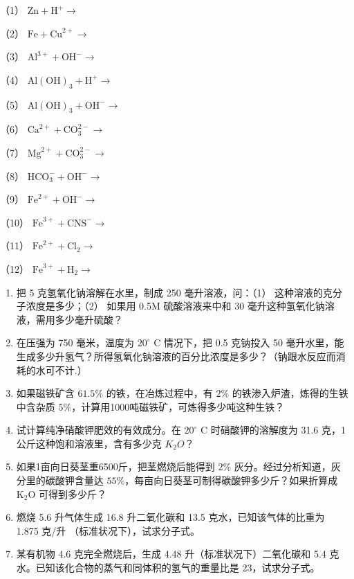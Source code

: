 （1） \(\mathrm{Zn} + \mathrm{H}^{+} \longrightarrow\)

（2） \(\mathrm{Fe} + \mathrm{Cu}^{2+} \longrightarrow\)

（3） \(\mathrm{Al}^{3+} + \mathrm{OH}^{-} \longrightarrow\)

（4） \(\mathrm{Al(OH)}_3 + \mathrm{H}^+ \longrightarrow\)

（5） \(\mathrm{Al(OH)}_3 + \mathrm{OH}^- \longrightarrow\)

（6） \(\mathrm{Ca}^{2+} + \mathrm{CO}_3^{2-}\longrightarrow\)

（7） \(\mathrm{Mg}^{2+} + \mathrm{CO}_{3}^{2-}\longrightarrow\)

（8） \(\mathrm{HCO}_{3}^{-} + \mathrm{OH}^{-}\longrightarrow\)

（9） \(\mathrm{Fe}^{2+} + \mathrm{OH}^{-}\longrightarrow\)

（10） \(\mathrm{Fe}^{3+} + \mathrm{CNS}^{-}\longrightarrow\)

（11） \(\mathrm{Fe}^{2+} + \mathrm{Cl}_2\longrightarrow\)

（12） \(\mathrm{Fe}^{3+} + \mathrm{H}_2\longrightarrow\)

\begin{enumerate}[start=20]
\item
  把 5 克氢氧化钠溶解在水里，制成 250 毫升溶液，问：（1）
  这种溶液的克分子浓度是多少；（2） 如果用 0.5M 硫酸溶液来中和 30
  毫升这种氢氧化钠溶液，需用多少毫升硫酸？
\item
  在压强为 750 毫米，温度为 \(20^{\circ}\) C 情况下，把 0.5 克钠投入 50
  毫升水里，能生成多少升氢气？所得氢氧化钠溶液的百分比浓度是多少？（钠跟水反应而消耗的水可不计.）
\item
  如果磁铁矿含 \(61.5\%\) 的铁，在冶炼过程中，有 \(2\%\)
  的铁渗入炉渣，炼得的生铁中含杂质
  \(5\%\)，计算用1000吨磁铁矿，可炼得多少吨这种生铁？
\item
  试计算纯净硝酸钾肥效的有效成分。在 \(20^{\circ}\) C 时硝酸钾的溶解度为
  31.6 克，1 公斤这种饱和溶液里，含有多少克 \(K_{2}O\)？
\item
  如果1亩向日葵茎重6500斤，把茎燃烧后能得到 \(2\%\)
  灰分。经过分析知道，灰分里的碳酸钾含量达
  \(55\%\)，每亩向日葵茎可制得碳酸钾多少斤？如果折算成
  \(\mathrm{K}_2\mathrm{O}\) 可得到多少斤？
\item
  燃烧 5.6 升气体生成 16.8 升二氧化碳和 13.5 克水，已知该气体的比重为
  1.875 克/升 （标准状况下），试求分子式。
\item
  某有机物 4.6 克完全燃烧后，生成 4.48 升（标准状况下）二氧化碳和 5.4
  克水。已知该化合物的蒸气和同体积的氢气的重量比是 23，试求分子式。
\end{enumerate}

